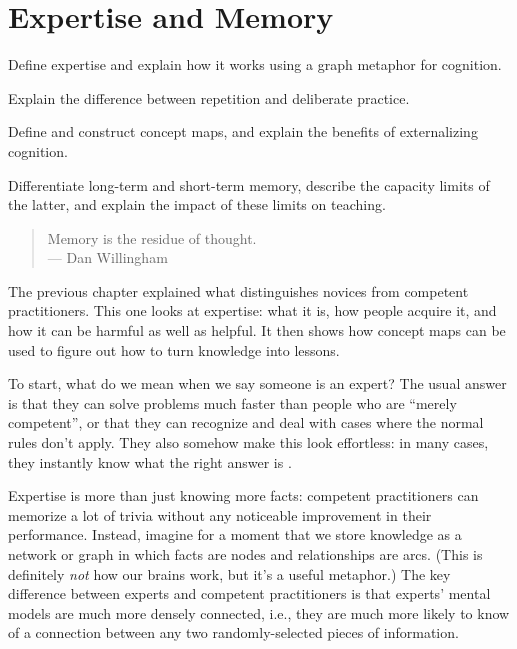 \chapter{Expertise and Memory}\label{s:memory}

\begin{objectives}

\item Define expertise and explain how it works using a graph metaphor
  for cognition.

\item Explain the difference between repetition and deliberate
  practice.

\item Define and construct concept maps, and explain the benefits of
  externalizing cognition.

\item Differentiate long-term and short-term memory, describe the
  capacity limits of the latter, and explain the impact of these
  limits on teaching.

\end{objectives}

\begin{quote}

  Memory is the residue of thought. \\
  --- Dan Willingham

\end{quote}

The previous chapter explained what distinguishes novices from
competent practitioners. This one looks at expertise: what it is, how
people acquire it, and how it can be harmful as well as helpful.  It
then shows how concept maps can be used to figure out how to turn
knowledge into lessons.

To start, what do we mean when we say someone is an expert? The usual
answer is that they can solve problems much faster than people who are
``merely competent'', or that they can recognize and deal with cases
where the normal rules don't apply. They also somehow make this look
effortless: in many cases, they instantly know what the right answer
is \cite{Parn2017}.

Expertise is more than just knowing more facts: competent
practitioners can memorize a lot of trivia without any noticeable
improvement in their performance. Instead, imagine for a moment that
we store knowledge as a network or graph in which facts are nodes and
relationships are arcs. (This is definitely \emph{not} how our brains
work, but it's a useful metaphor.) The key difference between experts
and competent practitioners is that experts' mental models are much
more densely connected, i.e., they are much more likely to know of a
connection between any two randomly-selected pieces of information.

